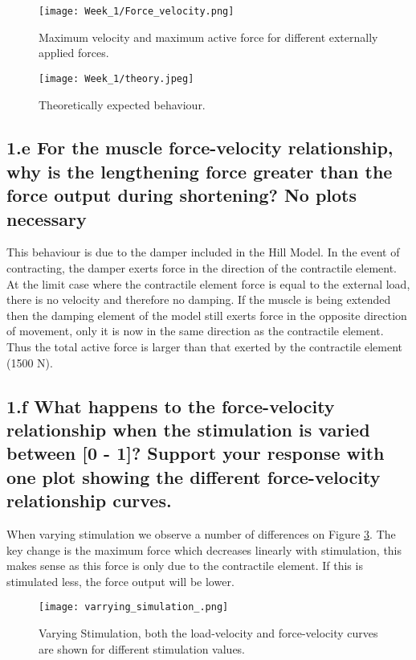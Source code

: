 \documentclass[11pt]{article}
\begin{document}
\begin{figure}[!h]
\texttt{[image: Week\_1/Force\_velocity.png]}
\centering
\caption{Maximum velocity and maximum active force for different externally applied forces.}
\label{fig:force_vel}
\end{figure}

\begin{figure}[!h]
\texttt{[image: Week\_1/theory.jpeg]}
\centering
\caption{Theoretically expected behaviour.}
\label{fig:theory}
\end{figure}


\subsection*{1.e For the muscle force-velocity relationship, why is
  the lengthening force greater than the force output during
  shortening? No plots necessary}

This behaviour is due to the damper included in the Hill Model. In the event of contracting, the damper exerts force in the direction of the contractile element. At the limit case where the contractile element force is equal to the external load, there is no velocity and therefore no damping. If the muscle is being extended then the damping element of the model still exerts force in the opposite direction of movement, only it is now in the same direction as the contractile element. Thus the total active force is larger than that exerted by the contractile element (1500 N). 

\subsection*{1.f What happens to the force-velocity relationship
  when the stimulation is varied between [0 - 1]? Support your
  response with one plot showing the different force-velocity
  relationship curves.  }
  
When varying stimulation we observe a number of differences on Figure \ref{fig:stim_var}. The key change is the maximum force which decreases linearly with stimulation, this makes sense as this force is only due to the contractile element. If this is stimulated less, the force output will be lower. 


\begin{figure}[!h]
\centering
\texttt{[image: varrying\_simulation\_.png]}

\caption{Varying Stimulation, both the load-velocity and force-velocity curves are shown for different stimulation values.}
\label{fig:stim_var}
\end{figure}
\newpage
\end{document}
